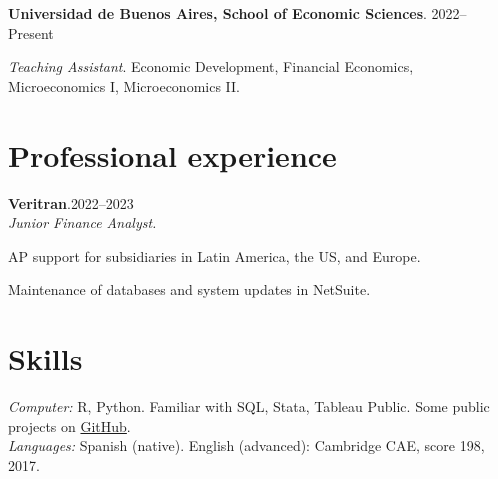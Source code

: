 \documentclass[11pt]{article}
\newcommand{\entrydate}[1]{\hfill{\small{#1}}}
\begin{document}
\textbf{Universidad de Buenos Aires, School of Economic Sciences}. \entrydate{2022--Present}
\begin{cvitems}
  \item \textit{Teaching Assistant}. Economic Development, Financial Economics, Microeconomics I, Microeconomics II.
\end{cvitems}

\section{Professional experience}
\textbf{Veritran}.\entrydate{2022--2023}\\
\textit{Junior Finance Analyst.}
\begin{cvitems}
  \item AP support for subsidiaries in Latin America, the US, and Europe.
  \item Maintenance of databases and system updates in NetSuite.
\end{cvitems}

\section{Skills}
\textit{Computer:} R, Python. Familiar with SQL, Stata, Tableau Public. Some public projects on \href{https://www.github.com/sanarovaz/}{GitHub}.\\
\textit{Languages:} Spanish (native). English (advanced): Cambridge CAE, score 198, 2017.
\end{document}
